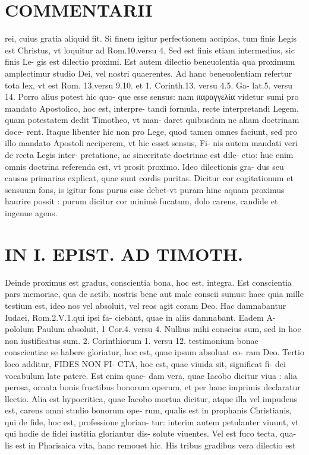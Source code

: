 \documentclass{article}
\begin{document}
\begin{pages}
\section*{COMMENTARII }\pstart rei, cuius gratia aliquid fit. Si finem igitur perfectionem accipias, tum finis Legis est Christus, vt loquitur ad Rom.10.versu 4. Sed est finis etiam intermedius, sic finis Le- gis est dilectio proximi. Est autem dilectio beneuolentia qua proximum amplectimur studio Dei, vel nostri quaerentes. Ad hanc beneuolentiam refertur tota lex, vt est Rom. 13.versu 9.10. et 1. Corinth.13. versu 4.5. Ga- lat.5. versu 14. Porro alius potest hic quo- que esse sensus: nam παραγγελία videtur sumi pro mandato Apostolico, hoc est, interpre- tandi formula, recte interpretandi Legem, quam potestatem dedit Timotheo, vt man- daret quibusdam ne aliam doctrinam doce- rent. Itaque libenter hic non pro Lege, quod tamen omnes faciunt, sed pro illo mandato Apostoli acciperem, vt hic esset sensus, Fi- nis autem mandati veri de recta Legis inter- pretatione, ac sinceritate doctrinae est dile- ctio: huc enim omnis doctrina referenda est, vt prosit proximo. Ideo dilectionis gra- dus seu causas primarias explicat, quae sunt cordis puritas. Dicitur cor cogitationum et sensuum fons, is igitur fons purus esse debet-vt puram hinc aquam proximus haurire possit : purum dicitur cor minimè fucatum, dolo carens, candide et ingenue agens.  \pend
\section*{IN I. EPIST. AD TIMOTH. }\pstart Deinde proximus est gradus, conscientia bona, hoc est, integra. Est conscientia pars memoriae, qua de actib. nostris bene aut male conscii sumus: haec quia mille testium est, ideo nos vel absoluit, vel reos agit coram Deo. Hac damnabantur Iudaei, Rom.2.V.1.qui ipsi fa- ciebant, quae in aliis damnabant. Eadem A- pololum Paulum absoluit, 1 Cor.4. versu 4. Nullius mihi conscius sum, sed in hoc non iustificatus sum. 2. Corinthiorum 1. versu 12. testimonium bonae conscientiae se habere gloriatur, hoc est, quae ipsum absoluat co- ram Deo.  \pend\pstart Tertio loco additur, FIDES NON FI- CTA, hoc est, quae viuida sit, significat fi- dei vocabulum late patere. Est enim quae- dam vera, quae Iacobo dicitur viua : alia perosa, ornata bonis fructibus bonorum operum, et per hanc imprimis declaratur llectio. Alia est hypocritica, quae Iacobo mortua dicitur, atque illa vel impudens est, carens omni studio bonorum ope- rum, qualis est in prophanis Christianis, qui de fide, hoc est, professione glorian- tur: interim autem petulanter viuunt, vt qui hodie de fidei iustitia gloriantur dis- solute viuentes. Vel est fuco tecta, qua- lis est in Pharisaica vita, hanc remouet hic. His tribus gradibus vera dilectio est  \pend
\marginpar{[ p.23 ]}

\end{pages}
\end{document}
